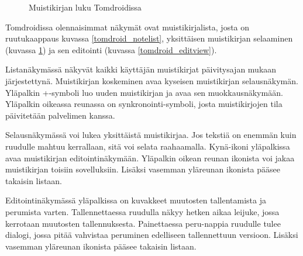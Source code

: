 \begin{figure}[h]
\centering
{}
\caption{Muistikirjan luku Tomdroidissa} \label{tomdroid_noteview}
\end{figure}

Tomdroidissa olennaisimmat näkymät ovat muistikirjalista, josta on ruutukaappaus kuvassa \ref{tomdroid_notelist}, yksittäisen muistikirjan selaaminen (kuvassa \ref{tomdroid_noteview}) ja sen editointi (kuvassa \ref{tomdroid_editview}). 

Listanäkymässä näkyvät kaikki käyttäjän muistikirjat päivitysajan mukaan järjestettynä. Muistikirjan koskeminen avaa kyseisen muistikirjan selausnäkymän. Yläpalkin +-symboli luo uuden muistikirjan ja avaa sen muokkausnäkymään. Yläpalkin oikeassa reunassa on synkronointi-symboli, josta muistikirjojen tila päivitetään palvelimen kanssa.

Selausnäkymässä voi lukea yksittäistä muistikirjaa. Jos tekstiä on enemmän kuin ruudulle mahtuu kerrallaan, sitä voi selata raahaamalla. Kynä-ikoni yläpalkissa avaa muistikirjan editointinäkymään. Yläpalkin oikean reunan ikonista voi jakaa muistikirjan toisiin sovelluksiin. Lisäksi vasemman yläreunan ikonista pääsee takaisin listaan.

Editointinäkymässä yläpalkissa on kuvakkeet muutosten tallentamista ja perumista varten. Tallennettaessa ruudulla näkyy hetken aikaa leijuke, jossa kerrotaan muutosten tallennuksesta. Painettaessa peru-nappia ruudulle tulee dialogi, jossa pitää vahvistaa peruminen edelliseen tallennettuun versioon. Lisäksi vasemman yläreunan ikonista pääsee takaisin listaan.

